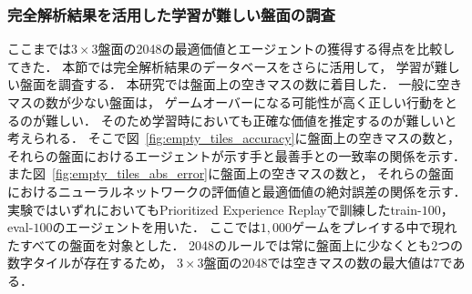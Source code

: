 \subsubsection{完全解析結果を活用した学習が難しい盤面の調査}
ここまでは$3\times3$盤面の2048の最適価値とエージェントの獲得する得点を比較してきた．
本節では完全解析結果のデータベースをさらに活用して， 学習が難しい盤面を調査する．
本研究では盤面上の空きマスの数に着目した．
一般に空きマスの数が少ない盤面は， ゲームオーバーになる可能性が高く正しい行動をとるのが難しい．
そのため学習時においても正確な価値を推定するのが難しいと考えられる．
そこで図~\ref{fig:empty_tiles_accuracy}に盤面上の空きマスの数と， それらの盤面におけるエージェントが示す手と最善手との一致率の関係を示す．
また図~\ref{fig:empty_tiles_abs_error}に盤面上の空きマスの数と， それらの盤面におけるニューラルネットワークの評価値と最適価値の絶対誤差の関係を示す．
実験ではいずれにおいてもPrioritized Experience Replayで訓練したtrain-$100$， eval-$100$のエージェントを用いた．
ここでは$1,000$ゲームをプレイする中で現れたすべての盤面を対象とした．
2048のルールでは常に盤面上に少なくとも$2$つの数字タイルが存在するため， $3\times3$盤面の2048では空きマスの数の最大値は$7$である．

